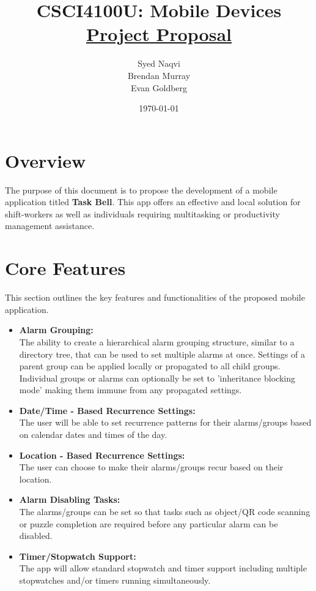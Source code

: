\documentclass{article}
\title{\vspace*{100pt}CSCI4100U: Mobile Devices \\ \underline{Project Proposal} \vspace*{30pt}}
\author{
    Syed Naqvi \\ 
    Brendan Murray \\ 
    Evan Goldberg
    \vspace*{30pt}
}
\date{\today}
\begin{document}
\maketitle
\newpage

\tableofcontents
\newpage

\section{Overview}
The purpose of this document is to propose the development of a mobile application titled \textbf{Task Bell}.
This app offers an effective and local solution for shift-workers as well as individuals requiring multitasking
or productivity management assistance.

\section{Core Features}
This section outlines the key features and functionalities of the proposed mobile application.
\begin{itemize}
    
    \item \textbf{Alarm Grouping:}\\The ability to create a hierarchical alarm grouping structure, similar to a directory tree,
    that can be used to set multiple alarms at once. Settings of a parent group can be applied locally or propagated to all child groups.
    Individual groups or alarms can optionally be set to 'inheritance blocking mode' making them immune from any propagated settings.

    \item \textbf{Date/Time - Based Recurrence Settings:}\\The user will be able to set recurrence patterns for their alarms/groups based on
    calendar dates and times of the day.

    \item \textbf{Location - Based Recurrence Settings:}\\The user can choose to make their alarms/groups recur based on their location.
    
    \item \textbf{Alarm Disabling Tasks:}\\The alarms/groups can be set so that tasks such as object/QR code scanning or puzzle completion
    are required before any particular alarm can be disabled.

    \item \textbf{Timer/Stopwatch Support:}\\The app will allow standard stopwatch and timer support including multiple stopwatches and/or
    timers running simultaneously.

\end{itemize}
\end{document}
